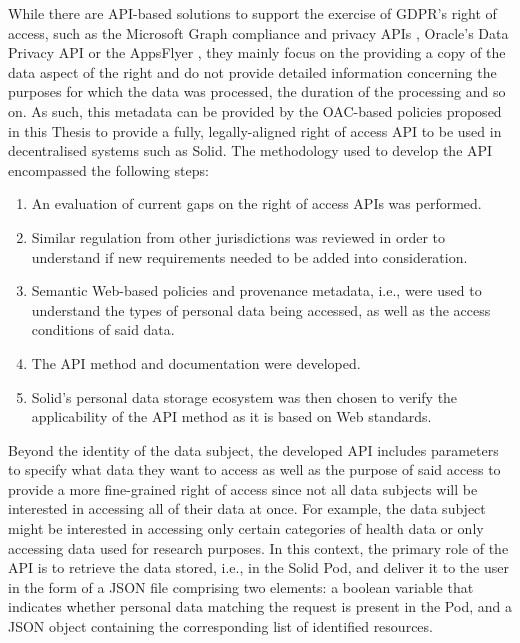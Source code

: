 While there are API-based solutions to support the exercise of GDPR's right of access, such as the Microsoft Graph compliance and privacy APIs \citeyearpar{noauthor_use_2022}, Oracle's Data Privacy API \citeyearpar{noauthor_appendix_2021} or the AppsFlyer \citeyearpar{noauthor_implementing_2022}, they mainly focus on the providing a copy of the data aspect of the right and do not provide detailed information concerning the purposes for which the data was processed, the duration of the processing and so on.
As such, this metadata can be provided by the OAC-based policies proposed in this Thesis to provide a fully, legally-aligned right of access API to be used in decentralised systems such as Solid.
The methodology used to develop the API encompassed the following steps:
\begin{enumerate}
    \item An evaluation of current gaps on the right of access APIs was performed.
    \item Similar regulation from other jurisdictions was reviewed in order to understand if new requirements needed to be added into consideration.
    \item Semantic Web-based policies and provenance metadata, i.e., were used to understand the types of personal data being accessed, as well as the access conditions of said data. %
    \item The API method and documentation were developed.
    \item Solid's personal data storage ecosystem was then chosen to verify the applicability of the API method as it is based on Web standards. 
\end{enumerate}
Beyond the identity of the data subject, the developed API includes parameters to specify what data they want to access as well as the purpose of said access to provide a more fine-grained right of access since not all data subjects will be interested in accessing all of their data at once.
For example, the data subject might be interested in accessing only certain categories of health data or only accessing data used for research purposes.
In this context, the primary role of the API is to retrieve the data stored, i.e., in the Solid Pod, and deliver it to the user in the form of a JSON file comprising two elements: a boolean variable that indicates whether personal data matching the request is present in the Pod, and a JSON object containing the corresponding list of identified resources.


